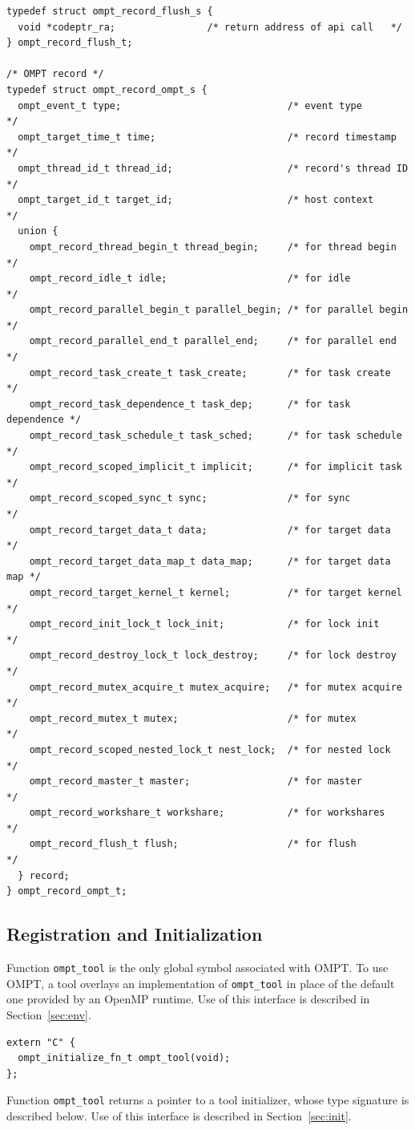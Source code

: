 \documentclass{article}
\begin{document}
\begin{verbatim}
typedef struct ompt_record_flush_s {
  void *codeptr_ra;                /* return address of api call   */
} ompt_record_flush_t;

/* OMPT record */
typedef struct ompt_record_ompt_s {
  ompt_event_t type;                             /* event type          */
  ompt_target_time_t time;                       /* record timestamp    */
  ompt_thread_id_t thread_id;                    /* record's thread ID  */
  ompt_target_id_t target_id;                    /* host context        */
  union {
    ompt_record_thread_begin_t thread_begin;     /* for thread begin    */
    ompt_record_idle_t idle;                     /* for idle            */
    ompt_record_parallel_begin_t parallel_begin; /* for parallel begin  */
    ompt_record_parallel_end_t parallel_end;     /* for parallel end    */
    ompt_record_task_create_t task_create;       /* for task create     */
    ompt_record_task_dependence_t task_dep;      /* for task dependence */
    ompt_record_task_schedule_t task_sched;      /* for task schedule   */
    ompt_record_scoped_implicit_t implicit;      /* for implicit task   */
    ompt_record_scoped_sync_t sync;              /* for sync            */
    ompt_record_target_data_t data;              /* for target data     */
    ompt_record_target_data_map_t data_map;      /* for target data map */
    ompt_record_target_kernel_t kernel;          /* for target kernel   */
    ompt_record_init_lock_t lock_init;           /* for lock init       */
    ompt_record_destroy_lock_t lock_destroy;     /* for lock destroy    */
    ompt_record_mutex_acquire_t mutex_acquire;   /* for mutex acquire   */
    ompt_record_mutex_t mutex;                   /* for mutex           */
    ompt_record_scoped_nested_lock_t nest_lock;  /* for nested lock     */
    ompt_record_master_t master;                 /* for master          */
    ompt_record_workshare_t workshare;           /* for workshares      */
    ompt_record_flush_t flush;                   /* for flush           */
  } record;
} ompt_record_ompt_t;
\end{verbatim}

\clearpage
\subsection{Registration and Initialization} 
\label{sec:app:init}

\noindent
Function \verb|ompt_tool| is the only global symbol associated with OMPT. To use OMPT, a tool overlays an implementation of \verb|ompt_tool| in place of the default one provided by an OpenMP runtime. Use of this interface is described in Section~\ref{sec:env}.
\begin{verbatim}
extern "C" {
  ompt_initialize_fn_t ompt_tool(void);
};
\end{verbatim}
Function \verb|ompt_tool| returns a pointer to a tool initializer, whose type signature is described below. Use of this interface is described in Section~\ref{sec:init}.
\end{document}
